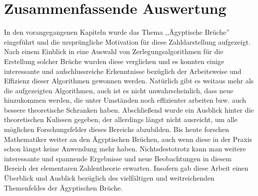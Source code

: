 \section{Zusammenfassende Auswertung}
In den vorangegangenen Kapiteln wurde das Thema ,,Ägyptische Brüche'' eingeführt und die ursprüngliche Motivation für diese Zahldarstellung aufgezeigt. Nach einem Einblick in eine Auswahl von Zerlegungsalgorithmen für die Erstellung solcher Brüche wurden diese verglichen und es konnten einige interessante und aufschlussreiche Erkenntnisse bezüglich der Arbeitsweise und Effizienz dieser Algorithmen gewonnen werden. Natürlich gibt es weitaus mehr als die aufgezeigten Algorithmen, auch ist es nicht unwahrscheinlich, dass neue hinzukommen werden, die unter Umständen noch effizienter arbeiten bzw. auch bessere theoretische Schranken haben. Abschließend wurde ein Ausblick hinter die theoretischen Kulissen gegeben, der allerdings längst nicht ausreicht, um alle möglichen Forschungsfelder dieses Bereichs abzubilden. Bis heute forschen Mathematiker weiter an den Ägyptischen Brüchen, auch wenn diese in der Praxis schon längst keine Anwendung mehr haben. Nichtsdestotrotz kann man weitere interessante und spannende Ergebnisse und neue Beobachtungen in diesem Bereich der elementaren Zahlentheorie erwarten. Insofern gab diese Arbeit einen Überblick und Ausblick bezüglich des vielfältigen und weitreichenden Themenfeldes der Ägyptischen Brüche.